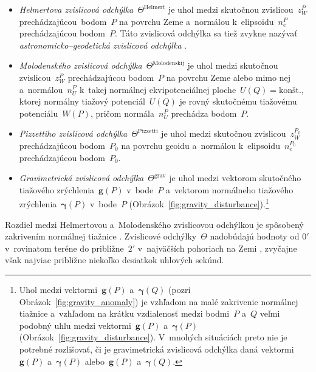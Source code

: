 \documentclass[a4paper, 12pt]{book}
\let\vec\mathbf
\begin{document}
\begin{itemize}
\item \emph{Helmertova zvislicová odchýlka}~$\Theta^\mathrm{Helmert}$ je uhol 
medzi skutočnou zvislicou~$z_W^P$ prechádzajúcou~bodom~$P$ na povrchu Zeme 
a~normálou k~elipsoidu~$n_e^P$ prechádzajúcou bodom~$P$.  Táto zvislicová 
odchýlka sa tiež zvykne nazývať \textit{astronomicko--geodetická zvislicová 
odchýlka} \parencite{Jekeli1999b}.

\item \emph{Molodenského zvislicová odchýlka}~$\Theta^\mathrm{Molodenskij}$ je 
uhol medzi skutočnou zvislicou~$z_W^P$ prechádzajúcou bodom~$P$ na povrchu Zeme 
alebo mimo nej a~normálou~$n_U^P$ k~takej normálnej ekvipotenciálnej 
ploche~$U(Q) = \textrm{kon\v{s}t.}$, ktorej normálny tiažový potenciál~$U(Q)$ 
je rovný skutočnému tiažovému potenciálu~$W(P)$, pričom normála~$n_U^P$ 
prechádza bodom~$P$.

\item \emph{Pizzettiho zvislicová odchýlka}~$\Theta^\mathrm{Pizzetti}$ je uhol 
medzi skutočnou zvislicou~$z_W^{P_0}$ prechádzajúcou bodom~$P_0$ na povrchu 
geoidu a~normálou k~elipsoidu~$n_e^{P_0}$ prechádzajúcou bodom~$P_0$.

\item \emph{Gravimetrická zvislicová odchýlka}~$\Theta^\mathrm{grav}$ je uhol 
medzi vektorom skutočného tiažového zrýchlenia~$\vec g(P)$ v~bode~$P$ 
a~vektorom normálneho tiažového zrýchlenia~$\boldsymbol\gamma(P)$ v~bode~$P$ 
(Obrázok~\ref{fig:gravity_disturbance}).\footnote{Uhol medzi vektormi~$\vec 
g(P)$ a~$\boldsymbol\gamma(Q)$ (pozri Obrázok~\ref{fig:gravity_anomaly}) je 
vzhľadom na malé zakrivenie normálnej tiažnice a~vzhľadom na krátku vzdialenosť 
medzi bodmi~$P$ a~$Q$ veľmi podobný uhlu medzi vektormi~$\vec g(P)$ 
a~$\boldsymbol\gamma(P)$ (Obrázok~\ref{fig:gravity_disturbance}).  V~mnohých 
situáciách preto nie je potrebné rozlišovať, či je gravimetrická zvislicová 
odchýlka daná vektormi~$\vec g(P)$ a~$\boldsymbol\gamma(P)$ alebo~$\vec g(P)$ 
a~$\boldsymbol\gamma(Q)$.}
\end{itemize}
%
Rozdiel medzi Helmertovou a~Molodenského zvislicovou odchýlkou je spôsobený 
zakrivením normálnej tiažnice \parencite{Jekeli1999b}.  Zvislicové 
odchýlky~$\Theta$ nadobúdajú hodnoty od $0'$ v~rovinatom teréne do 
približne~$2'$ v~najväčších pohoriach na Zemi \parencite{GGMplus}, zvyčajne 
však najviac približne niekoľko desiatkok uhlových sekúnd.
\end{document}
